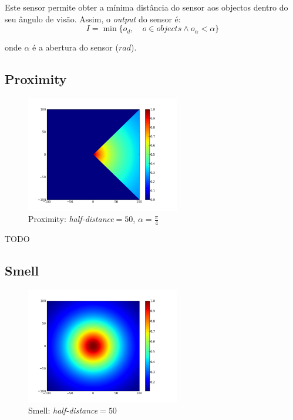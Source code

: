 \documentclass[a4paper]{article}
\begin{document}
\indent Este sensor permite obter a mínima distância do sensor aos objectos dentro do seu ângulo de visão.
Assim, o \emph{output} do sensor é:
\[
	I = \min\{o_{d},\quad o \in objects \land o_{\alpha} < \alpha\}
\] 

onde $\alpha$ é a abertura do sensor ($rad$).

\cleardoublepage
\subsection{Proximity}

\begin{figure}[h]
	\vspace{-20pt}
	\begin{center}
		\includegraphics[width=0.6\textwidth]{graphs/sensors/proximity.png}
	\end{center}
	\vspace{-20pt}
	\caption{Proximity: \emph{half-distance}$=50$, $\alpha=\frac{\pi}{4}$}
\end{figure}

TODO

\cleardoublepage
\subsection{Smell}
\begin{figure}[h]
	\vspace{-20pt}
	\begin{center}
		\includegraphics[width=0.6\textwidth]{graphs/sensors/smell.png}
	\end{center}
	\vspace{-20pt}
	\caption{Smell: \emph{half-distance}$=50$}
\end{figure}
\end{document}
